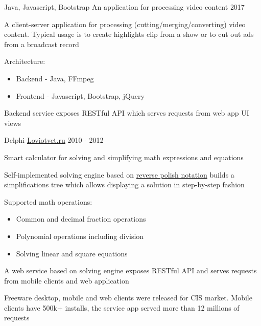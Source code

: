 \begin{cventries}
  \cventry
    {Java, Javascript, Bootstrap}
    {An application for processing video content}
    {}
    {2017}
    {
      \begin{cvitems} %
      	\item A client-server application for processing (cutting/merging/converting) video content. Typical usage is to create highlights clip from a show or to cut out ads from a broadcast record
        \item Architecture:
          \begin{itemize}[label={•},leftmargin=10pt]
              \item Backend - Java, FFmpeg
              \item Frontend - Javascript, Bootstrap, jQuery
          \end{itemize}
		\item Backend service exposes RESTful API which serves requests from web app UI views
      \end{cvitems}
    }

  \cventry
  {Delphi}
  {\color{awesome-skyblue}\href{http://loviotvet.ru}{\underline{Loviotvet.ru}}}
  {}
  {2010 - 2012}
  {
      \begin{cvitems} %
          \item Smart calculator for solving and simplifying math expressions and equations
          \item Self-implemented solving engine based on {\color{awesome-skyblue}\href{https://en.wikipedia.org/wiki/Reverse_Polish_notation}{reverse polish notation}} builds a simplifications tree which allows displaying a solution in step-by-step fashion
          \item Supported math operations:
          \begin{itemize}[label={•},leftmargin=10pt]
              \item Common and decimal fraction operations
              \item Polynomial operations including division
              \item Solving linear and square equations
          \end{itemize}
          \item A web service based on solving engine exposes RESTful API and serves requests from mobile clients and web application
          \item Freeware desktop, mobile and web clients were released for CIS market. Mobile clients have 500k+ installs, the service app served more than 12 millions of requests
      \end{cvitems}
  }


\end{cventries}
